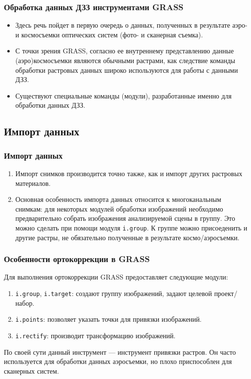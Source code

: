 
\begin{frame}
    \frametitle{Обработка данных ДЗЗ инструментами GRASS}
    \begin{itemize}
        \item Здесь речь пойдет в первую очередь о данных, полученных в
        результате аэро- и космосъемки оптических систем (фото- и сканерная съемка).
        \item С точки зрения GRASS, согласно ее внутреннему представлению данные (аэро)космосъемки являются обычными растрами, как следствие команды обработки растровых данных широко используются для работы с данными ДЗЗ.
        \item Существуют специальные команды (модули), разработанные именно для обработки данных ДЗЗ.
    \end{itemize}
\end{frame}

\subsection{Импорт данных}
\begin{frame}
    \frametitle{Импорт данных}
    \begin{enumerate}
        \item Импорт снимков производится точно также, как и импорт других растровых материалов.
        \item Основная особенность импорта данных относится к многоканальным снимкам: для некоторых модулей обработки изображений необходимо предварительно собрать изображения анализируемой сцены в группу. Это можно сделать при помощи модуля \lstinline!i.group!. К группе можно присоеденить и другие растры, не обязательно полученные в результате космо/аэросъемки.
    \end{enumerate}
\end{frame}

\begin{frame}
    \frametitle{Особенности ортокоррекции в GRASS}
    Для выполнения ортокоррекции GRASS предоставляет следующие модули:
    \begin{enumerate}
        \item \lstinline!i.group!, \lstinline!i.target!: создают группу изображений, задают целевой проект/набор.
        \item \lstinline!i.points!: позволяет указать точки для привязки изображений.
        \item \lstinline!i.rectify!: производит трансформацию изображений.
    \end{enumerate}

    По своей сути данный инструмент --- инструмент привязки растров. Он часто используется для обработки данных аэросъемки, но плохо приспособлен для сканерных систем.
\end{frame}


